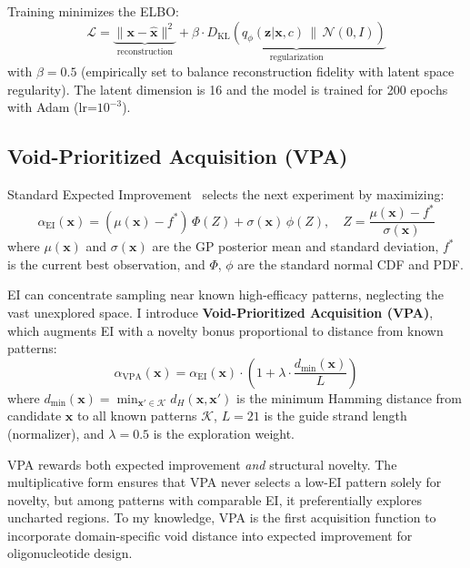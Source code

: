 \documentclass{article}
\begin{document}
Training minimizes the ELBO:
\begin{equation}
  \mathcal{L} = \underbrace{\|\mathbf{x} - \hat{\mathbf{x}}\|^2}_{\text{reconstruction}} + \beta \cdot \underbrace{D_\text{KL}\left(q_\phi(\mathbf{z}|\mathbf{x},c) \,\|\, \mathcal{N}(0, I)\right)}_{\text{regularization}}
  \label{eq:elbo}
\end{equation}
with $\beta = 0.5$ (empirically set to balance reconstruction fidelity with latent space regularity). The latent dimension is 16 and the model is trained for 200 epochs with Adam (lr=$10^{-3}$).

\subsection{Void-Prioritized Acquisition (VPA)}
\label{sec:vpa}

Standard Expected Improvement~\citep{snoek2012} selects the next experiment by maximizing:
\begin{equation}
  \alpha_\text{EI}(\mathbf{x}) = (\mu(\mathbf{x}) - f^*) \, \Phi(Z) + \sigma(\mathbf{x}) \, \phi(Z), \quad Z = \frac{\mu(\mathbf{x}) - f^*}{\sigma(\mathbf{x})}
  \label{eq:ei}
\end{equation}
where $\mu(\mathbf{x})$ and $\sigma(\mathbf{x})$ are the GP posterior mean and standard deviation, $f^*$ is the current best observation, and $\Phi$, $\phi$ are the standard normal CDF and PDF.

EI can concentrate sampling near known high-efficacy patterns, neglecting the vast unexplored space. I introduce \textbf{Void-Prioritized Acquisition (VPA)}, which augments EI with a novelty bonus proportional to distance from known patterns:
\begin{equation}
  \alpha_\text{VPA}(\mathbf{x}) = \alpha_\text{EI}(\mathbf{x}) \cdot \left(1 + \lambda \cdot \frac{d_\text{min}(\mathbf{x})}{L}\right)
  \label{eq:vpa}
\end{equation}
where $d_\text{min}(\mathbf{x}) = \min_{\mathbf{x}' \in \mathcal{K}} d_H(\mathbf{x}, \mathbf{x}')$ is the minimum Hamming distance from candidate $\mathbf{x}$ to all known patterns $\mathcal{K}$, $L=21$ is the guide strand length (normalizer), and $\lambda = 0.5$ is the exploration weight.

VPA rewards both expected improvement \emph{and} structural novelty. The multiplicative form ensures that VPA never selects a low-EI pattern solely for novelty, but among patterns with comparable EI, it preferentially explores uncharted regions. To my knowledge, VPA is the first acquisition function to incorporate domain-specific void distance into expected improvement for oligonucleotide design.
\end{document}
